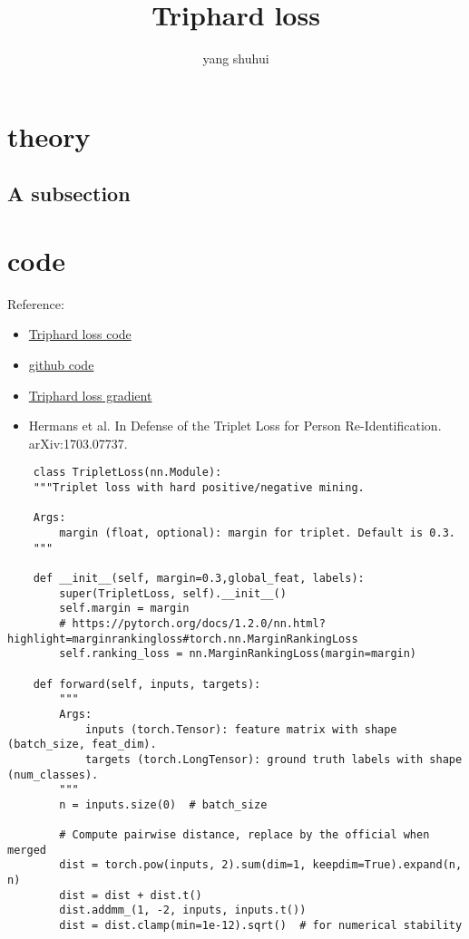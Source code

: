 \documentclass[UTF8]{ctexart} %
\title{Triphard loss}
\author{yang shuhui}
\begin{document}
 
\maketitle

\section{theory}

\subsection{A subsection}


\section{code}
Reference:
\begin{itemize}
    \item  \href{https://blog.csdn.net/qq_32523711/article/details/103826600}{Triphard loss code}
    \item \href{https://github.com/Cysu/open-reid/blob/master/reid/loss/triplet.py}{github code}
    \item \href{https://blog.csdn.net/tangwei2014/article/details/46788025}{Triphard loss gradient}
    \item Hermans et al. In Defense of the Triplet Loss for Person Re-Identification. arXiv:1703.07737.
\end{itemize}
\begin{lstlisting}
    class TripletLoss(nn.Module):
    """Triplet loss with hard positive/negative mining.
        
    Args:
        margin (float, optional): margin for triplet. Default is 0.3.
    """
    
    def __init__(self, margin=0.3,global_feat, labels):
        super(TripletLoss, self).__init__()
        self.margin = margin
        # https://pytorch.org/docs/1.2.0/nn.html?highlight=marginrankingloss#torch.nn.MarginRankingLoss
        self.ranking_loss = nn.MarginRankingLoss(margin=margin)
 
    def forward(self, inputs, targets):
        """
        Args:
            inputs (torch.Tensor): feature matrix with shape (batch_size, feat_dim).
            targets (torch.LongTensor): ground truth labels with shape (num_classes).
        """
        n = inputs.size(0)	# batch_size
        
        # Compute pairwise distance, replace by the official when merged
        dist = torch.pow(inputs, 2).sum(dim=1, keepdim=True).expand(n, n)
        dist = dist + dist.t()
        dist.addmm_(1, -2, inputs, inputs.t())
        dist = dist.clamp(min=1e-12).sqrt()  # for numerical stability
\end{lstlisting}
\end{document}
